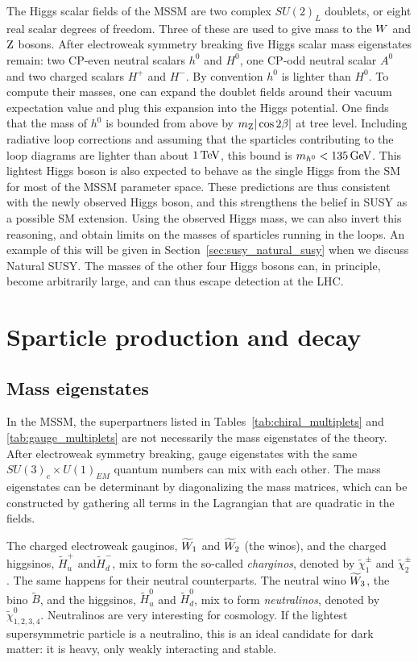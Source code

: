 The Higgs scalar fields of the MSSM are two complex $SU(2)_L$ doublets, or eight real scalar degrees
of freedom. 
Three of these are used to give mass to the $W$ and $\mathrm{Z}$ bosons. 
After electroweak symmetry breaking five Higgs scalar mass eigenstates remain: two CP-even neutral
scalars $h^0$ and $H^0$, one CP-odd neutral scalar $A^0$ and two charged scalars $H^+$ and $H^-$. By
convention $h^0$ is lighter than $H^0$. 
To compute their masses, one can expand the doublet fields around their vacuum expectation value and
plug this expansion into the Higgs potential. One finds that the mass of $h^0$ is bounded from
above by $m_{\mathrm{Z}} |\cos 2\beta|$ at tree level. Including radiative loop corrections and assuming
that the sparticles contributing to the loop diagrams are lighter than about $1\,\text{Te\hspace{-.08em}V}$, this bound is
$m_{h^0} < 135\,\text{Ge\hspace{-.08em}V}$. 
This lightest Higgs boson is also expected to behave as the single Higgs from the SM for most of
the MSSM parameter space. 
These predictions are thus consistent with the newly observed Higgs boson, and this strengthens the
belief in SUSY as a possible SM extension. Using the observed Higgs mass,
we can also invert this reasoning, and obtain limits on the masses of sparticles running in the
loops. An example of this will be given in Section~\ref{sec:susy_natural_susy} when we discuss
Natural SUSY. 
The masses of the other four Higgs bosons can, in principle, become arbitrarily large, and can
thus escape detection at the LHC. 


\section{Sparticle production and decay \label{sec:susy_sparticles}}

\subsection{Mass eigenstates}

In the MSSM, the superpartners listed in Tables~\ref{tab:chiral_multiplets} and
\ref{tab:gauge_multiplets} are not necessarily the mass eigenstates of the theory. After
electroweak symmetry breaking, gauge eigenstates with the same $SU(3)_c \times U(1)_{EM}$ quantum
numbers can mix with each other. 
The mass eigenstates can be determinant by diagonalizing the mass matrices, which can be
constructed by gathering all terms in the Lagrangian that are quadratic in the fields. 

The charged electroweak gauginos, $\widetilde{W}_1$ and $\widetilde{W}_2$ (the winos), and the
charged higgsinos, $\widetilde{H}_u^+$ and$\widetilde{H}_d^-$, mix to form the so-called
\textit{charginos}, denoted by $\widetilde{\chi}_1^\pm$ and $\widetilde{\chi}_2^\pm$. 
The same happens for their neutral counterparts. The neutral wino $\widetilde{W}_3$, the bino
$\widetilde{B}$, and the higgsinos, $\widetilde{H}_u^0$ and $\widetilde{H}_d^0$,  mix to form
\textit{neutralinos}, denoted by $\widetilde{\chi}_{1,2,3,4}^0$. 
Neutralinos are very interesting for cosmology. If the lightest supersymmetric particle is a
neutralino, this is an ideal candidate for dark matter: it is heavy, only weakly interacting and
stable. 

